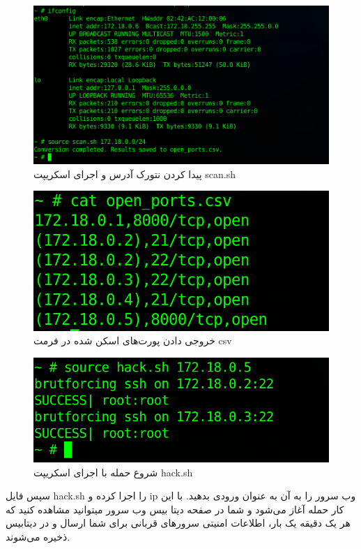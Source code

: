 \documentclass[11pt]{article}
\begin{document}
\begin{figure}[hbtp]
\caption{پیدا کردن نتورک آدرس و اجرای اسکریپت scan.sh}
\centering
\includegraphics[scale=0.2]{images/scan_sample.png}
\end{figure}


\begin{figure}[hbtp]
\caption{خروجی دادن پورت‌های اسکن شده در فرمت csv}
\centering
\includegraphics[scale=0.2]{images/open_ports.png}
\end{figure}



\begin{figure}[hbtp]
\caption{شروع حمله با اجرای اسکریپت hack.sh}
\centering
\includegraphics[scale=0.2]{images/hack_sample.png}
\end{figure}
سپس فایل hack.sh را اجرا کرده و ip وب سرور را به آن به عنوان ورودی بدهید. با این کار حمله آغاز می‌شود و شما در صفحه دیتا بیس وب سرور میتوانید مشاهده کنید که هر یک دقیقه یک بار، اطلاعات امنیتی سرورهای قربانی برای شما ارسال و در دیتابیس ذخیره می‌شوند.
\end{document}
